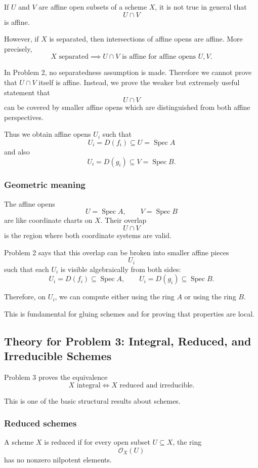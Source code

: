 \documentclass[12pt,a4paper]{article}
\DeclareMathOperator{\Spec}{Spec}
\newcommand{\OO}{\mathcal{O}}
\providecommand{\Spec}{\operatorname{Spec}}
\theoremstyle{notespace}
\begin{document}
If \(U\) and \(V\) are affine open subsets of a scheme \(X\), it is not true in general that
\[
U\cap V
\]
is affine.

However, if \(X\) is separated, then intersections of affine opens are affine. More precisely,
\[
X\text{ separated}
\implies
U\cap V\text{ is affine for affine opens }U,V.
\]

In Problem 2, no separatedness assumption is made. Therefore we cannot prove that \(U\cap V\) itself is affine. Instead, we prove the weaker but extremely useful statement that
\[
U\cap V
\]
can be covered by smaller affine opens which are distinguished from both affine perspectives.

Thus we obtain affine opens \(U_i\) such that
\[
U_i=D(f_i)\subseteq U=\Spec A
\]
and also
\[
U_i=D(g_i)\subseteq V=\Spec B.
\]

\subsubsection*{Geometric meaning}

The affine opens
\[
U=\Spec A,
\qquad
V=\Spec B
\]
are like coordinate charts on \(X\). Their overlap
\[
U\cap V
\]
is the region where both coordinate systems are valid.

Problem 2 says that this overlap can be broken into smaller affine pieces
\[
U_i
\]
such that each \(U_i\) is visible algebraically from both sides:
\[
U_i=D(f_i)\subseteq \Spec A,
\qquad
U_i=D(g_i)\subseteq \Spec B.
\]

Therefore, on \(U_i\), we can compute either using the ring \(A\) or using the ring \(B\).

This is fundamental for gluing schemes and for proving that properties are local.

\subsection{Theory for Problem 3: Integral, Reduced, and Irreducible Schemes}

Problem 3 proves the equivalence
\[
\boxed{
	X\text{ integral}
	\iff
	X\text{ reduced and irreducible}.
}
\]

This is one of the basic structural results about schemes.

\subsubsection*{Reduced schemes}

A scheme \(X\) is reduced if for every open subset \(U\subseteq X\), the ring
\[
\OO_X(U)
\]
has no nonzero nilpotent elements.
\end{document}
